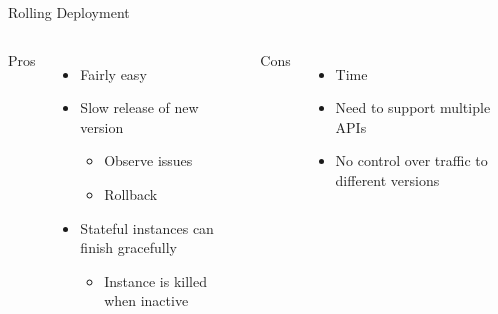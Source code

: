 \documentclass{slide}
\begin{document}
\begin{frame}{Rolling Deployment}
    \vspace{1pt}
    \begin{columns}[t]
      \huge Pros
      {\LARGE
        \begin{itemize}
            \item Fairly easy
            \vspace{1mm}
            \item Slow release of new version
            \begin{itemize}
                \Large\item Observe issues
                \Large\item Rollback
            \end{itemize}
            \vspace{2mm}
            \item Stateful instances can finish gracefully
            \begin{itemize}
                \Large\item Instance is killed when inactive
            \end{itemize}
        \end{itemize}
      }
      \huge Cons
      {\LARGE
        \begin{itemize}
            \item Time
            \item Need to support multiple APIs
            \item No control over traffic to different versions
        \end{itemize}
      }
    \end{columns}
\end{frame}
\end{document}
